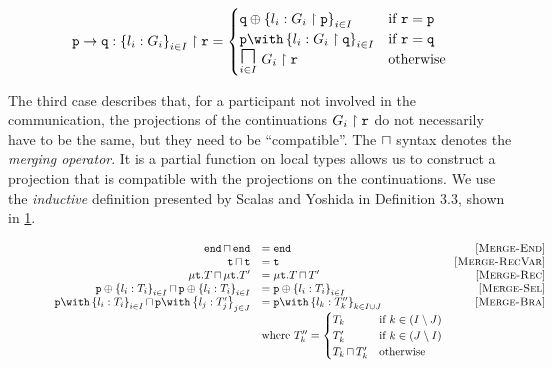 \[
\proj{\gcomm{p}{q}{l_i: G_i}{i \in I}}{r} =
\begin{cases}
\tsel{q}{l_i: \proj{G_i}{p}}{i \in I} 
	& \text{if } \mrole{r} = \mrole{p} \\
\tbra{p}{l_i: \proj{G_i}{q}}{i \in I} 
	& \text{if } \mrole{r} = \mrole{q} \\
\underset{i \in I}{\MERGEOP}~\proj{G_i}{r}
	& \text{otherwise} \\
\end{cases}
\]

The third case describes that,
for a participant not involved in the communication,
the projections of the continuations ${G_i} \upharpoonright {\mathtt{r}}$
do not necessarily have to be the same, but they
need to be ``compatible''. 
The $\sqcap$ syntax denotes the \textit{merging operator}.
It is a partial function on local types allows us to construct
a projection that is compatible with the projections on
the continuations.
We use the \textit{inductive} definition presented by
Scalas and Yoshida in \cite{LessIsMore} Definition 3.3,
shown in \cref{fig:merge}.

\begin{figure}[!h]
\doublespacing
\[
\begin{array}{rlr}

\tmerge{\tend}{\tend} &= \tend 
	& \rulename{Merge-End} \\
\tmerge{\trecvar}{\trecvar} &= \trecvar 
	& \rulename{Merge-RecVar} \\
\tmerge{\trec{T}}{\trec{T'}} &= \trec{\tmerge{T}{T'}} 
	& \rulename{Merge-Rec} \\
\tmerge{\tsel{p}{l_i: T_i}{i \in I}}{\tsel{p}{l_i: T_i}{i \in I}} 
	&= \tsel{p}{l_i: T_i}{i \in I}
	& \rulename{Merge-Sel} \\
\tmerge{\tbra{p}{l_i: T_i}{i \in I}}{\tbra{p}{l_j: T'_j}{j \in J}} 
	&= \tbra{p}{l_k: T''_k}{k \in I \cup J}
	& \rulename{Merge-Bra} \\

	& 
	\text{where } T''_k =
	\begin{cases}
	T_k & \text{if } k \in (I \setminus J) \\
	T'_k & \text{if } k \in (J \setminus I) \\
	\tmerge{T_k}{T'_k} & \text{otherwise} \\
	\end{cases}
	& \\

\end{array}
\]
\singlespacing
{}
\label{fig:merge}
\end{figure}

